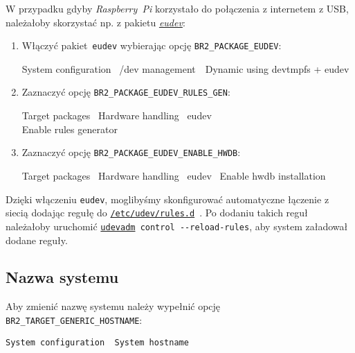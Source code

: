 \documentclass{article}
\newenvironment{ttblock}{\ttfamily}{\par}
\begin{document}
\noindent W przypadku gdyby \emph{Raspberry~Pi} korzystało do połączenia z internetem z USB, należałoby skorzystać np. z pakietu \emph{\href{https://wiki.archlinux.org/index.php/Eudev}{eudev}}:
\begin{enumerate}
\item Włączyć pakiet~\texttt{eudev} wybierając opcję \texttt{BR2\_PACKAGE\_EUDEV}:

\begin{ttblock}
System configuration \textrightarrow\ /dev management\ \textrightarrow\ Dynamic using devtmpfs + eudev
\end{ttblock}

\item Zaznaczyć opcję \texttt{BR2\_PACKAGE\_EUDEV\_RULES\_GEN}:

\begin{ttblock}
Target packages \textrightarrow\ Hardware handling \textrightarrow\ eudev \textrightarrow\\Enable rules generator
\end{ttblock}

\item Zaznaczyć opcję \texttt{BR2\_PACKAGE\_EUDEV\_ENABLE\_HWDB}:

\begin{ttblock}
Target packages \textrightarrow\ Hardware handling \textrightarrow\ eudev \textrightarrow\ Enable hwdb installation
\end{ttblock}
\end{enumerate}

\noindent Dzięki włączeniu \texttt{eudev}, moglibyśmy skonfigurować automatyczne łączenie z siecią dodając regułę do \href{http://www.reactivated.net/writing_udev_rules.html}{\texttt{/etc/udev/rules.d}}~\cite{www:arch-udev}. Po dodaniu takich reguł należałoby uruchomić \texttt{\href{http://linux.die.net/man/8/udevadm}{udevadm} control -{}-reload-rules}, aby system załadował dodane reguły.


\subsection{Nazwa systemu}

Aby zmienić nazwę systemu należy wypełnić opcję \texttt{BR2\_TARGET\_GENERIC\_HOSTNAME}:

\begin{center}
\texttt{System configuration \textrightarrow\ System hostname}
\end{center}
\end{document}
